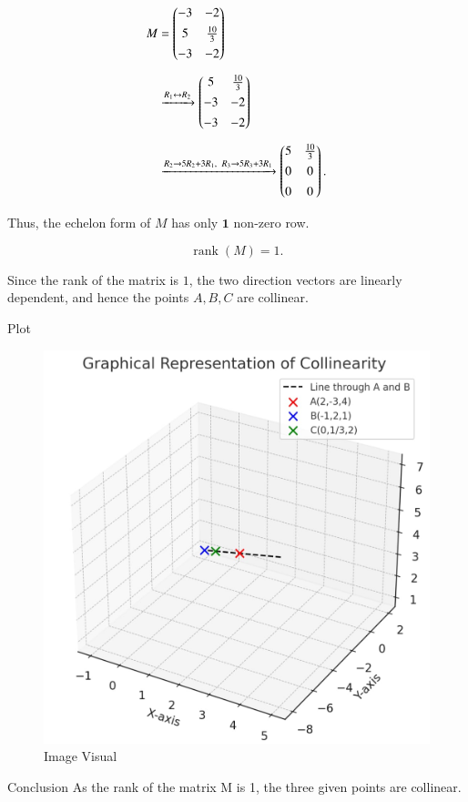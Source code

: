 \documentclass{beamer}
\begin{document}
\begin{frame}
    

\[
\begin{aligned}
M &= \begin{pmatrix} -3 & -2 \\[4pt] 5 & \tfrac{10}{3} \\[4pt] -3 & -2 \end{pmatrix} \\[6pt]
&\xrightarrow{R_1 \leftrightarrow R_2}
\begin{pmatrix} 5 & \tfrac{10}{3} \\[4pt] -3 & -2 \\[4pt] -3 & -2 \end{pmatrix} \\[6pt]
&\xrightarrow{R_2 \to 5R_2+3R_1,\;\; R_3 \to 5R_3+3R_1}
\begin{pmatrix} 5 & \tfrac{10}{3} \\[4pt] 0 & 0 \\[4pt] 0 & 0 \end{pmatrix}.
\end{aligned}
\]

Thus, the echelon form of \(M\) has only \(\mathbf{1}\) non-zero row.

\begin{equation}
\operatorname{rank}(M) = 1.
\label{eq:rank}
\end{equation}

Since the rank of the matrix is \(1\), the two direction vectors are linearly dependent, and hence the points \(A,B,C\) are collinear.

\end{frame}
\begin{frame}{Plot}
   \begin{figure}[H]
    \centering
    \includegraphics[width=0.6\linewidth]{figs/image.png}
    \caption{Image Visual}
    \label{fig:figs/image.png}
\end{figure}
\end{frame}
\begin{frame}{Conclusion}
    As the rank of the matrix M is 1, the three given points are collinear.
\end{frame}
\end{document}
